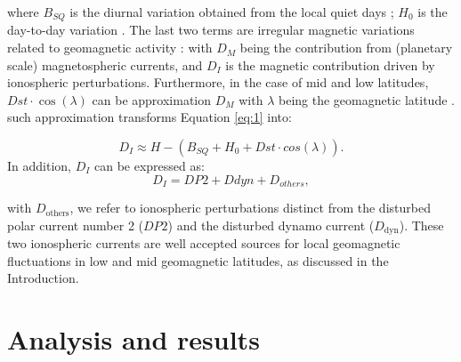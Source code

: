 \documentclass[a4paper,fleqn]{cas-dc}
\begin{document}
where $B_{SQ}$ is the diurnal variation obtained from the local quiet days \citep{vanKampt}; $H_0$ is the day-to-day variation \citep{baseline_Gjerloev, vanKampt}. The last two terms are irregular magnetic variations related to geomagnetic activity \citep{ddyn2005, angeoddyn}: with $D_M$ being the contribution from (planetary scale) magnetospheric currents, and $D_I$ is the magnetic contribution driven by ionospheric perturbations. Furthermore, in the case of mid and low latitudes, $Dst \cdot \cos(\lambda)$ can be approximation $D_M$ with $\lambda$ being the geomagnetic latitude \citep{amorymazaudier_2017}. such approximation transforms Equation \ref{eq:1} into: 


\begin{equation}
\label{eq:diono}
   D_{I} \approx H -(B_{SQ} +  H_0 + Dst \cdot cos(\lambda)).
\end{equation}
In addition, $D_{I}$ can be expressed as:
\begin{equation}
\label{eq:diono_explicit}
   D_{I} = DP2 + Ddyn + D_{others},
\end{equation}


with $D_{\text{others}}$, we refer to ionospheric perturbations distinct from the disturbed polar current number 2 ($DP2$) and the disturbed dynamo current ($D_{\text{dyn}}$). These two ionospheric currents are well accepted sources for local geomagnetic fluctuations in low and mid geomagnetic latitudes, as discussed in the Introduction.


\section{Analysis and results}
\label{results}
\end{document}
